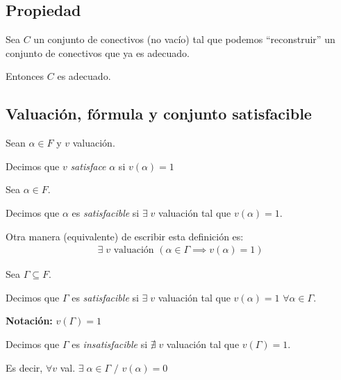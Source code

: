 \subsection{Propiedad}

Sea $C$ un conjunto de conectivos (no vacío) tal que podemos ``reconstruir''
un conjunto de conectivos que ya es adecuado.

Entonces $C$ es adecuado.

\subsection{Valuación, fórmula y conjunto satisfacible}

\begin{definicion}{}{}
    Sean $\alpha \in F$ y $v$ valuación.

    \medskip 

    Decimos que $v$ \textit{satisface} $\alpha$ si $v(\alpha)=1$
\end{definicion}

\medskip

\begin{definicion}{}{}
    Sea $\alpha \in F$.
    
    \medskip

    Decimos que $\alpha$ es \textit{satisfacible} si $\exists \; v$ valuación tal que
    $v(\alpha) = 1$.
\end{definicion}

Otra manera (equivalente) de escribir esta definición es:
\begin{gather*}
    \exists \; v \text{ valuación } (\alpha \in \Gamma \implies v(\alpha) = 1)
\end{gather*}

\medskip

\begin{definicion}{}{}
    Sea $\Gamma \subseteq F$.

    \medskip

    Decimos que $\Gamma$ es \textit{satisfacible} si $\exists \; v$ valuación tal que
    $v(\alpha) = 1$ $\forall \alpha \in \Gamma$.

    \bigskip
    \textbf{Notación:}
    $v(\Gamma) = 1$ 

    \medskip

    Decimos que $\Gamma$ es \textit{insatisfacible} si $\nexists \; v$ 
    valuación tal que $v(\Gamma)=1$.

    Es decir, $\forall v$ val. $\exists \; \alpha \in \Gamma$ $/$ $v(\alpha)=0$
\end{definicion}

